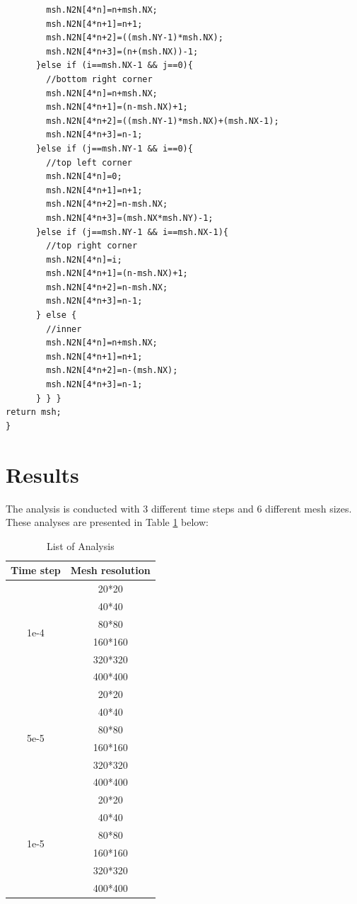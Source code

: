 \documentclass{article}
\begin{document}
\begin{verbatim}
        msh.N2N[4*n]=n+msh.NX; 
        msh.N2N[4*n+1]=n+1;
        msh.N2N[4*n+2]=((msh.NY-1)*msh.NX); 
        msh.N2N[4*n+3]=(n+(msh.NX))-1; 
      }else if (i==msh.NX-1 && j==0){
        //bottom right corner 
        msh.N2N[4*n]=n+msh.NX; 
        msh.N2N[4*n+1]=(n-msh.NX)+1;
        msh.N2N[4*n+2]=((msh.NY-1)*msh.NX)+(msh.NX-1); 
        msh.N2N[4*n+3]=n-1; 
      }else if (j==msh.NY-1 && i==0){
        //top left corner 
        msh.N2N[4*n]=0; 
        msh.N2N[4*n+1]=n+1;
        msh.N2N[4*n+2]=n-msh.NX; 
        msh.N2N[4*n+3]=(msh.NX*msh.NY)-1;
      }else if (j==msh.NY-1 && i==msh.NX-1){
        //top right corner 
        msh.N2N[4*n]=i; 
        msh.N2N[4*n+1]=(n-msh.NX)+1;
        msh.N2N[4*n+2]=n-msh.NX; 
        msh.N2N[4*n+3]=n-1;
      } else {
        //inner
        msh.N2N[4*n]=n+msh.NX; 
        msh.N2N[4*n+1]=n+1;
        msh.N2N[4*n+2]=n-(msh.NX); 
        msh.N2N[4*n+3]=n-1;
      } } }
return msh; 
}
\end{verbatim}


\clearpage
\section{Results}
The analysis is conducted with 3 different time steps and 6 different mesh sizes. These analyses are presented in Table \ref{tab:label1} below: 
\begin{table}[htbp] %
\caption{List of Analysis}
  \centering
  \begin{tabular}{|c|c|}
    \hline
     Time step& Mesh resolution  \\
    \hline
    \multirow{6}{*}{1e-4} & 20*20 \\
                         & 40*40 \\
                         & 80*80 \\
                         & 160*160 \\
                         & 320*320 \\
                         & 400*400 \\
    \hline
    \multirow{6}{*}{5e-5} & 20*20 \\
                         & 40*40 \\
                         & 80*80 \\
                         & 160*160 \\
                         & 320*320 \\
                         & 400*400 \\
    \hline
    \multirow{6}{*}{1e-5} & 20*20 \\
                         & 40*40 \\
                         & 80*80 \\
                         & 160*160 \\
                         & 320*320 \\
                         & 400*400 \\
    \hline
  \end{tabular}
  \label{tab:label1}  
\end{table}
\end{document}
